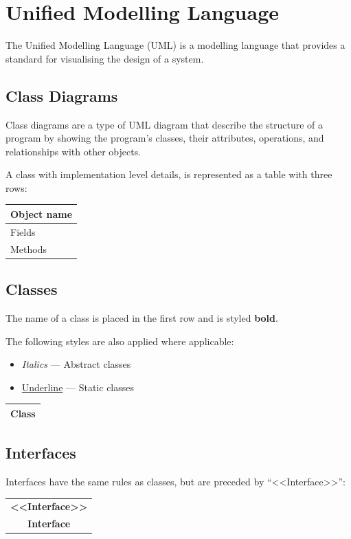 \documentclass{article}
\begin{document}
\section{Unified Modelling Language}
The Unified Modelling Language (UML) is a modelling language that provides a standard for visualising the
design of a system.
\subsection{Class Diagrams}
Class diagrams are a type of UML diagram that describe the structure of a program by showing the program's classes,
their attributes, operations, and relationships with other objects.

A class with implementation level details, is represented as a table with three rows:
\begin{table}[H]
    \centering
    \begin{tabular}{|l|} %
        \hline %
        \textbf{Object name} \\
        \hline %
        Fields               \\
        \hline %
        Methods              \\
        \hline %
    \end{tabular}
\end{table}
\subsection{Classes}
The name of a class is placed in the first row and is styled \textbf{bold}.

The following styles are also applied where applicable:
\begin{itemize}
    \item \textit{Italics} --- Abstract classes
    \item \underline{Underline} --- Static classes
\end{itemize}
\begin{table}[H]
    \centering
    \begin{tabular}{|c|} %
        \hline %
        \textbf{Class} \\
        \hline %
    \end{tabular}
\end{table}
\subsection{Interfaces}
Interfaces have the same rules as classes, but are preceded by ``<<Interface>>'':
\begin{table}[H]
    \centering
    \begin{tabular}{|c|} %
        \hline %
        \textbf{<<Interface>>} \\
        \textbf{Interface}     \\
        \hline %
    \end{tabular}
\end{table}
\end{document}
